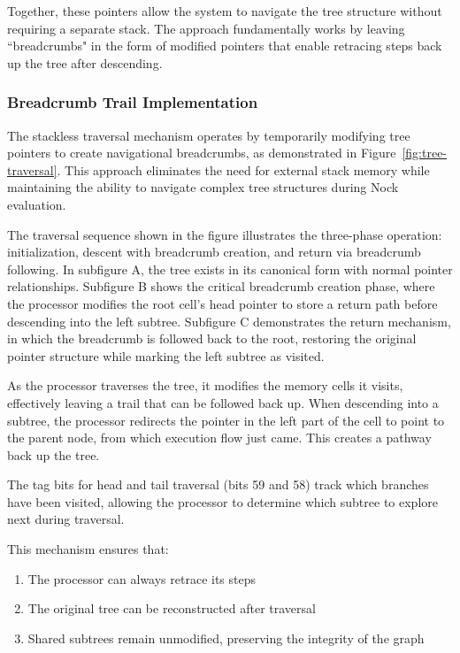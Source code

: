 \documentclass[twoside]{article}
\begin{document}
\noindent
Together, these pointers allow the system to navigate the tree structure without requiring a separate stack. The approach fundamentally works by leaving ``breadcrumbs" in the form of modified pointers that enable retracing steps back up the tree after descending.

\subsubsection{Breadcrumb Trail Implementation}

The stackless traversal mechanism operates by temporarily modifying tree pointers to create navigational breadcrumbs, as demonstrated in Figure~\ref{fig:tree-traversal}. This approach eliminates the need for external stack memory while maintaining the ability to navigate complex tree structures during Nock evaluation.



The traversal sequence shown in the figure illustrates the three-phase operation: initialization, descent with breadcrumb creation, and return via breadcrumb following. In subfigure A, the tree exists in its canonical form with normal pointer relationships. Subfigure B shows the critical breadcrumb creation phase, where the processor modifies the root cell's head pointer to store a return path before descending into the left subtree. Subfigure C demonstrates the return mechanism, in which the breadcrumb is followed back to the root, restoring the original pointer structure while marking the left subtree as visited.

As the processor traverses the tree, it modifies the memory cells it visits, effectively leaving a trail that can be followed back up. When descending into a subtree, the processor redirects the pointer in the left part of the cell to point to the parent node, from which execution flow just came. This creates a pathway back up the tree.

The tag bits for head and tail traversal (bits 59 and 58) track which branches have been visited, allowing the processor to determine which subtree to explore next during traversal.

This mechanism ensures that:
\begin{enumerate}
  \item The processor can always retrace its steps
  \item The original tree can be reconstructed after traversal
  \item Shared subtrees remain unmodified, preserving the integrity of the graph
\end{enumerate}
\end{document}
